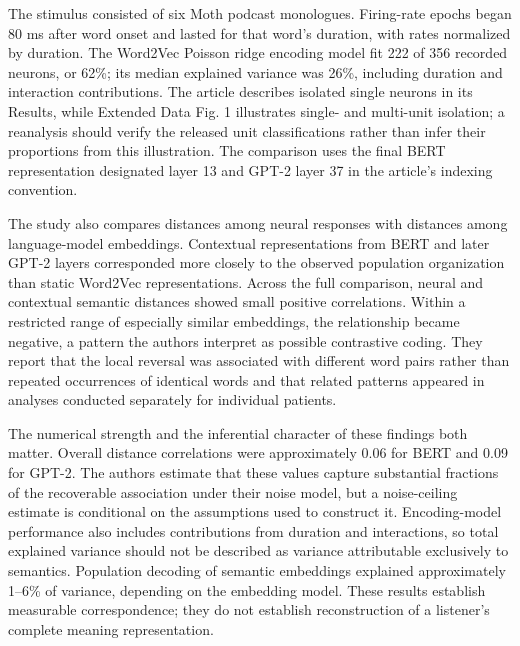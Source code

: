 \documentclass[11pt]{article}
\begin{document}
The stimulus consisted of six Moth podcast monologues. Firing-rate
epochs began 80 ms after word onset and lasted for that word's duration,
with rates normalized by duration. The Word2Vec Poisson ridge encoding
model fit 222 of 356 recorded neurons, or 62\%; its median explained
variance was 26\%, including duration and interaction contributions. The
article describes isolated single neurons in its Results, while Extended
Data Fig. 1 illustrates single- and multi-unit isolation; a reanalysis
should verify the released unit classifications rather than infer their
proportions from this illustration. The comparison uses the final BERT
representation designated layer 13 and GPT-2 layer 37 in the article's
indexing convention.

The study also compares distances among neural responses with distances
among language-model embeddings. Contextual representations from BERT
and later GPT-2 layers corresponded more closely to the observed
population organization than static Word2Vec representations. Across the
full comparison, neural and contextual semantic distances showed small
positive correlations. Within a restricted range of especially similar
embeddings, the relationship became negative, a pattern the authors
interpret as possible contrastive coding. They report that the local
reversal was associated with different word pairs rather than repeated
occurrences of identical words and that related patterns appeared in
analyses conducted separately for individual patients.

The numerical strength and the inferential character of these findings
both matter. Overall distance correlations were approximately 0.06 for
BERT and 0.09 for GPT-2. The authors estimate that these values capture
substantial fractions of the recoverable association under their noise
model, but a noise-ceiling estimate is conditional on the assumptions
used to construct it. Encoding-model performance also includes
contributions from duration and interactions, so total explained
variance should not be described as variance attributable exclusively to
semantics. Population decoding of semantic embeddings explained
approximately 1--6\% of variance, depending on the embedding model.
These results establish measurable correspondence; they do not establish
reconstruction of a listener's complete meaning representation.
\end{document}
